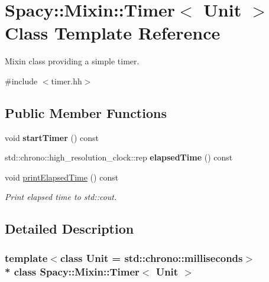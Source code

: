 \hypertarget{classSpacy_1_1Mixin_1_1Timer}{}\section{Spacy\+:\+:Mixin\+:\+:Timer$<$ Unit $>$ Class Template Reference}
\label{classSpacy_1_1Mixin_1_1Timer}


Mixin class providing a simple timer.  




{\ttfamily \#include $<$timer.\+hh$>$}

\subsection*{Public Member Functions}
\begin{DoxyCompactItemize}
\item 
void {\bfseries start\+Timer} () const \hypertarget{classSpacy_1_1Mixin_1_1Timer_acf3c292b6d482c7c4ded5f961be4bc4b}{}\label{classSpacy_1_1Mixin_1_1Timer_acf3c292b6d482c7c4ded5f961be4bc4b}

\item 
std\+::chrono\+::high\+\_\+resolution\+\_\+clock\+::rep {\bfseries elapsed\+Time} () const \hypertarget{classSpacy_1_1Mixin_1_1Timer_ab27a20d8e1e9bc90ea56cb18ff752798}{}\label{classSpacy_1_1Mixin_1_1Timer_ab27a20d8e1e9bc90ea56cb18ff752798}

\item 
void \hyperlink{classSpacy_1_1Mixin_1_1Timer_a3b79b35213702118d0823f6040d5a315}{print\+Elapsed\+Time} () const \hypertarget{classSpacy_1_1Mixin_1_1Timer_a3b79b35213702118d0823f6040d5a315}{}\label{classSpacy_1_1Mixin_1_1Timer_a3b79b35213702118d0823f6040d5a315}

\begin{DoxyCompactList}\small\item\em Print elapsed time to std\+::cout. \end{DoxyCompactList}\end{DoxyCompactItemize}


\subsection{Detailed Description}
\subsubsection*{template$<$class Unit = std\+::chrono\+::milliseconds$>$\\*
class Spacy\+::\+Mixin\+::\+Timer$<$ Unit $>$}

